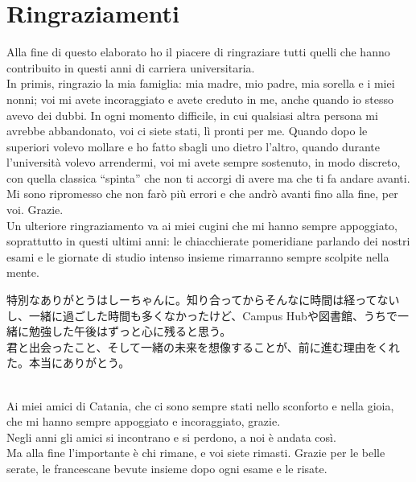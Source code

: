 \chapter*{Ringraziamenti}

Alla fine di questo elaborato ho il piacere di ringraziare tutti quelli che hanno contribuito in questi anni di carriera universitaria.\\

In primis, ringrazio la mia famiglia: mia madre, mio padre, mia sorella e i miei nonni; voi mi avete incoraggiato e avete creduto in me,
 anche quando io stesso avevo dei dubbi. In ogni momento difficile, in cui qualsiasi altra persona mi avrebbe abbandonato, voi ci siete stati,
  lì pronti per me. Quando dopo le superiori volevo mollare e ho fatto sbagli uno dietro l’altro, quando durante l’università volevo arrendermi, 
  voi mi avete sempre sostenuto, in modo discreto, con quella classica “spinta” che non ti accorgi di avere ma che ti fa andare avanti.\\ 
  Mi sono ripromesso che non farò più errori e che andrò avanti fino alla fine, per voi. Grazie.\\

Un ulteriore ringraziamento va ai miei cugini che mi hanno sempre appoggiato, soprattutto in questi ultimi anni: le chiacchierate pomeridiane
 parlando dei nostri esami e le giornate di studio intenso insieme rimarranno sempre scolpite nella mente.\\

 \begin{CJK}{UTF8}{min}
特別なありがとうはしーちゃんに。知り合ってからそんなに時間は経ってないし、一緒に過ごした時間も多くなかったけど、Campus Hubや図書館、うちで一緒に勉強した午後はずっと心に残ると思う。\\
 君と出会ったこと、そして一緒の未来を想像することが、前に進む理由をくれた。本当にありがとう。
 \end{CJK}
 \\

Ai miei amici di Catania, che ci sono sempre stati nello sconforto e nella gioia, che mi hanno sempre appoggiato e incoraggiato, grazie.\\
 Negli anni gli amici si incontrano e si perdono, a noi è andata così. \\
 Ma alla fine l’importante è chi rimane, e voi siete rimasti. Grazie per le belle serate, le francescane bevute insieme dopo ogni esame e le risate.\\

